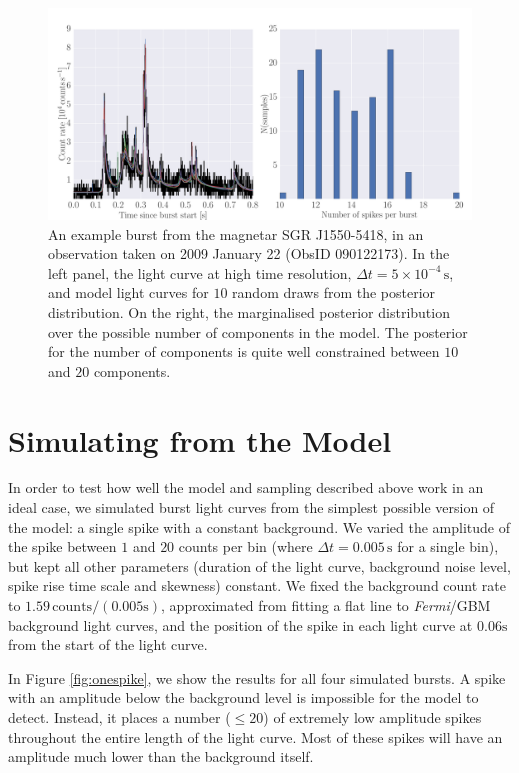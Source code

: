 \documentclass[12pt]{emulateapj}
\newcommand{\project}[1]{\textsl{#1}}
\newcommand{\fermi}{\project{Fermi}}
\begin{document}
\begin{figure}[htbp]
\includegraphics[width=\textwidth]{f3.pdf}%
\caption{An example burst from the magnetar SGR J1550-5418, in an observation taken on 2009 January 22 (ObsID 090122173). In the left
panel, the light curve at high time resolution, $\Delta t = 5 \times 10^{-4}\,\mathrm{s}$, and model light curves for $10$ random draws from the posterior distribution. 
On the right, the marginalised posterior distribution over the possible number of components in the model. The posterior for the number of components is 
quite well constrained between $10$ and $20$ components.}
\label{fig:dnest_example}
\end{figure}


\section{Simulating from the Model}
\label{ch6:modelsims}

In order to test how well the model and sampling described above work in an ideal case, we simulated burst light curves from the simplest possible version
of the model: a single spike with a constant background. We varied the amplitude of the spike between $1$ and $20$ counts per bin (where $\Delta t = 0.005\,\mathrm{s}$ for
a single bin), but kept all other parameters (duration of the light curve, background noise level, spike rise time scale and skewness) constant. 
We fixed the background count rate to $1.59\,\mathrm{counts}/(0.005\mathrm{s})$, approximated from fitting a flat line to \fermi/GBM background light curves, and the position
of the spike in each light curve at $0.06\mathrm{s}$ from the start of the light curve.

In Figure \ref{fig:onespike}, we show the results for all four simulated bursts. A spike with an amplitude below the background level is impossible for the model
to detect. Instead, it places a number ($\leq 20$) of extremely low amplitude spikes throughout the entire length of the light curve. Most of these spikes will have an amplitude
much lower than the background itself. 
\end{document}
